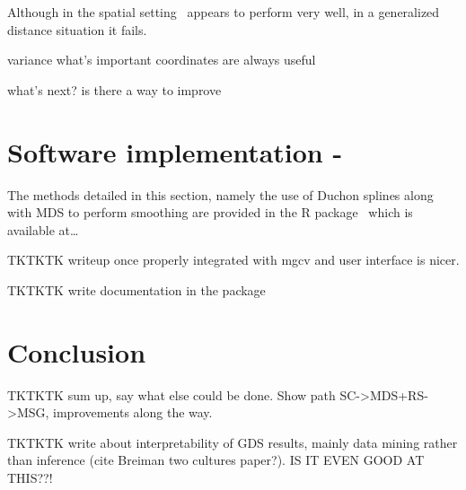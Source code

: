 Although in the spatial setting \mdsds\ appears to perform very well, in a generalized distance situation it fails.

   variance
   what's important
   coordinates are always useful


   what's next?
   is there a way to improve




\section{Software implementation - \mdspack}
\label{gds-software}

The methods detailed in this section, namely the use of Duchon splines along with MDS to perform smoothing are provided in the \textsf{R} package \mdspack\ which is available at\ldots

TKTKTK writeup once properly integrated with mgcv and user interface is nicer.

TKTKTK write documentation in the package


\section{Conclusion}
\label{gds-conclusion}

TKTKTK sum up, say what else could be done. Show path SC->MDS+RS->MSG, improvements along the way.

TKTKTK write about interpretability of GDS results, mainly data mining rather than inference (cite Breiman two cultures paper?). IS IT EVEN GOOD AT THIS??!

